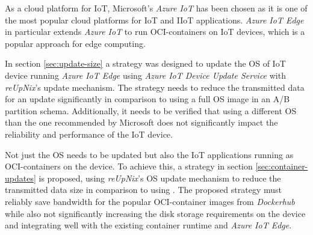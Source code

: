 As a cloud platform for \ac{IoT}, Microsoft's \textit{Azure IoT} has been chosen
as it is one of the most popular cloud platforms for \ac{IoT} and \ac{IIoT} applications.
\textit{Azure IoT Edge} in particular extends \textit{Azure IoT} to run
\ac{OCI}-containers on \ac{IoT} devices, which is a popular approach for edge
computing.

In section \ref{sec:update-size} a strategy was designed to update the \ac{OS} of \ac{IoT} device running
\textit{Azure IoT Edge} using \textit{Azure IoT Device Update Service} with
\textit{reUpNix}'s update mechanism. The strategy needs to reduce the transmitted data
for an update significantly in comparison to using a full \ac{OS} image in an
A/B partition schema. Additionally, it needs to be verified that using a different
\ac{OS} than the one recommended by Microsoft does not significantly impact
the reliability and performance of the \ac{IoT} device.


Not just the \ac{OS} needs to be updated but also the \ac{IoT} applications
running as \ac{OCI}-containers on the device. To achieve this,
a strategy in section \ref{sec:container-updates} is proposed,
using \textit{reUpNix}'s \ac{OS} update mechanism to reduce the transmitted data
size in comparison to using . The proposed strategy must
reliably save bandwidth for the popular \ac{OCI}-container images from
\textit{Dockerhub} while also not significantly increasing the disk storage
requirements on the device and integrating well with the existing container
runtime and \textit{Azure IoT Edge}.

